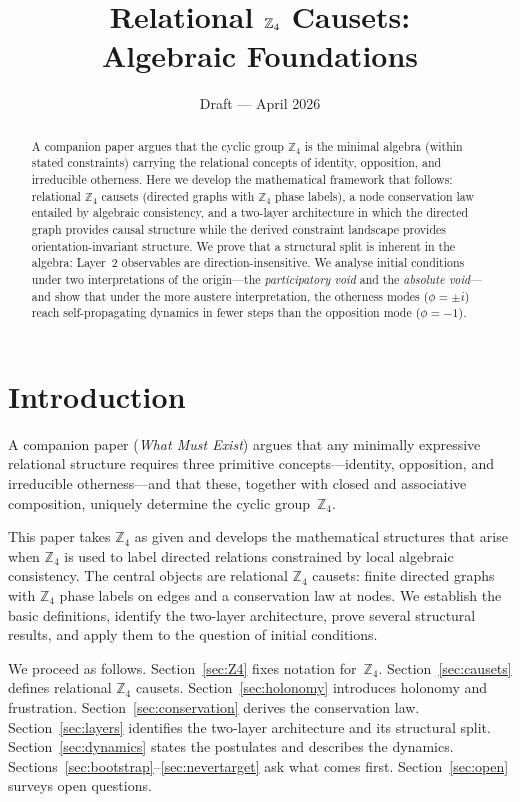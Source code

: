 \documentclass[11pt,a4paper]{article}
\title{Relational $\Zf$ Causets: \\[4pt]
\large Algebraic Foundations}
\author{}
\date{Draft --- April 2026}
\theoremstyle{definition}
\theoremstyle{plain}
\theoremstyle{remark}
\newcommand{\Zf}{\mathbb{Z}_4}
\begin{document}
\maketitle

\begin{abstract}
  A companion paper argues that the cyclic group $\Zf$ is the minimal algebra (within stated constraints) carrying the relational concepts of identity, opposition, and irreducible otherness.  Here we develop the mathematical framework that follows: relational $\Zf$ causets (directed graphs with $\Zf$ phase labels), a node conservation law entailed by algebraic consistency, and a two-layer architecture in which the directed graph provides causal structure while the derived constraint landscape provides orientation-invariant structure.  We prove that a structural split is inherent in the algebra: Layer~2 observables are direction-insensitive.  We analyse initial conditions under two interpretations of the origin---the \emph{participatory void} and the \emph{absolute void}---and show that under the more austere interpretation, the otherness modes ($\phi = \pm i$) reach self-propagating dynamics in fewer steps than the opposition mode ($\phi = -1$).
\end{abstract}

\tableofcontents
\newpage

\section{Introduction}\label{sec:intro}

A companion paper (\emph{What Must Exist}) argues that any minimally expressive relational structure requires three primitive concepts---identity, opposition, and irreducible otherness---and that these, together with closed and associative composition, uniquely determine the cyclic group~$\Zf$.

This paper takes $\Zf$ as given and develops the mathematical structures that arise when $\Zf$ is used to label directed relations constrained by local algebraic consistency.  The central objects are relational $\Zf$ causets: finite directed graphs with $\Zf$ phase labels on edges and a conservation law at nodes.  We establish the basic definitions, identify the two-layer architecture, prove several structural results, and apply them to the question of initial conditions.

We proceed as follows.  Section~\ref{sec:Z4} fixes notation for~$\Zf$.  Section~\ref{sec:causets} defines relational $\Zf$ causets.  Section~\ref{sec:holonomy} introduces holonomy and frustration.  Section~\ref{sec:conservation} derives the conservation law.  Section~\ref{sec:layers} identifies the two-layer architecture and its structural split.  Section~\ref{sec:dynamics} states the postulates and describes the dynamics.  Sections~\ref{sec:bootstrap}--\ref{sec:nevertarget} ask what comes first.  Section~\ref{sec:open} surveys open questions.
\end{document}
